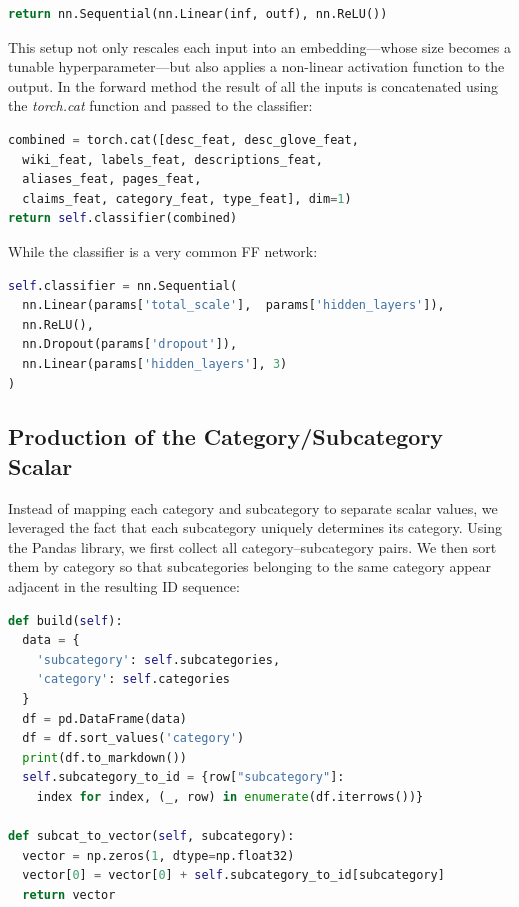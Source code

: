 \documentclass[11pt]{article}
\begin{document}
\scriptsize
	\begin{lstlisting}[language=python]
return nn.Sequential(nn.Linear(inf, outf), nn.ReLU())
	\end{lstlisting}
\normalsize

This setup not only rescales each input into an embedding—whose size becomes a tunable hyperparameter—but also applies a non-linear activation function to the output. \newline In the forward method the result of all the inputs is concatenated using the \emph{torch.cat} function and passed to the classifier:

\scriptsize
	 \begin{lstlisting}[language=python]
combined = torch.cat([desc_feat, desc_glove_feat, 
  wiki_feat, labels_feat, descriptions_feat, 
  aliases_feat, pages_feat,
  claims_feat, category_feat, type_feat], dim=1)
return self.classifier(combined)
	 \end{lstlisting}
\normalsize

While the classifier is a very common FF network:
\scriptsize
    \begin{lstlisting}[language=python]
self.classifier = nn.Sequential(
  nn.Linear(params['total_scale'],  params['hidden_layers']),
  nn.ReLU(),
  nn.Dropout(params['dropout']),
  nn.Linear(params['hidden_layers'], 3)
)
    \end{lstlisting}
\normalsize
	 
\subsection{Production of the Category/Subcategory Scalar}
Instead of mapping each category and subcategory to separate scalar values, we leveraged the fact that each subcategory uniquely determines its category. Using the Pandas library, we first collect all category–subcategory pairs. We then sort them by category so that subcategories belonging to the same category appear adjacent in the resulting ID sequence:

\scriptsize
	\begin{lstlisting}[language=python]	
def build(self):
  data = {
    'subcategory': self.subcategories,
    'category': self.categories
  }
  df = pd.DataFrame(data)
  df = df.sort_values('category')
  print(df.to_markdown())
  self.subcategory_to_id = {row["subcategory"]: 
    index for index, (_, row) in enumerate(df.iterrows())}

def subcat_to_vector(self, subcategory):
  vector = np.zeros(1, dtype=np.float32)
  vector[0] = vector[0] + self.subcategory_to_id[subcategory]
  return vector
	\end{lstlisting}
\normalsize
\end{document}
